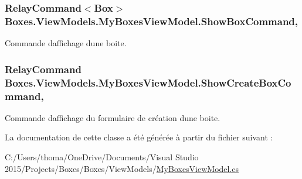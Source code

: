 \subsubsection[{\texorpdfstring{Show\+Box\+Command}{ShowBoxCommand}}]{\setlength{\rightskip}{0pt plus 5cm}Relay\+Command$<${\bf Box}$>$ Boxes.\+View\+Models.\+My\+Boxes\+View\+Model.\+Show\+Box\+Command\hspace{0.3cm}{\ttfamily [get]}, {}}\hypertarget{class_boxes_1_1_view_models_1_1_my_boxes_view_model_a1210f5d646cb1ca103f53bbdf9b67c7a}{}\label{class_boxes_1_1_view_models_1_1_my_boxes_view_model_a1210f5d646cb1ca103f53bbdf9b67c7a}


Commande d\textquotesingle{}affichage d\textquotesingle{}une boite. 

\subsubsection[{\texorpdfstring{Show\+Create\+Box\+Command}{ShowCreateBoxCommand}}]{\setlength{\rightskip}{0pt plus 5cm}Relay\+Command Boxes.\+View\+Models.\+My\+Boxes\+View\+Model.\+Show\+Create\+Box\+Command\hspace{0.3cm}{\ttfamily [get]}, {}}\hypertarget{class_boxes_1_1_view_models_1_1_my_boxes_view_model_a1923523832932df6b3278c833ba50ac2}{}\label{class_boxes_1_1_view_models_1_1_my_boxes_view_model_a1923523832932df6b3278c833ba50ac2}


Commande d\textquotesingle{}affichage du formulaire de création d\textquotesingle{}une boite. 



La documentation de cette classe a été générée à partir du fichier suivant \+:\begin{DoxyCompactItemize}
\item 
C\+:/\+Users/thoma/\+One\+Drive/\+Documents/\+Visual Studio 2015/\+Projects/\+Boxes/\+Boxes/\+View\+Models/\hyperlink{_my_boxes_view_model_8cs}{My\+Boxes\+View\+Model.\+cs}\end{DoxyCompactItemize}

